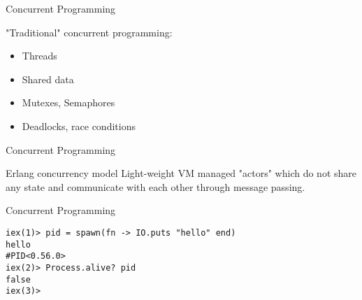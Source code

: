 \documentclass{beamer}
\begin{document}
\begin{frame}[fragile]{Concurrent Programming}

"Traditional" concurrent programming:

\begin{itemize}
  \item Threads
  \item Shared data
  \item Mutexes, Semaphores 
  \item Deadlocks, race conditions
\end{itemize}

\end{frame}

\begin{frame}[fragile]{Concurrent Programming}

\begin{block}{Erlang concurrency model}
Light-weight VM managed "actors" which do not share 
any state and communicate with each other through
message passing.
\end{block}

\end{frame}

\begin{frame}[fragile]{Concurrent Programming}

\begin{verbatim}
iex(1)> pid = spawn(fn -> IO.puts "hello" end)
hello
#PID<0.56.0>
iex(2)> Process.alive? pid
false
iex(3)> 
\end{verbatim}

\end{frame}
\end{document}
